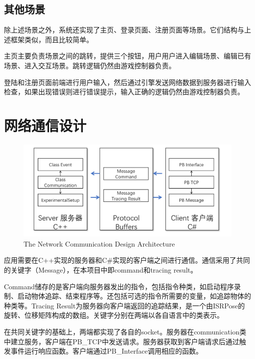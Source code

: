 \subsection{其他场景}
除上述场景之外，系统还实现了主页、登录页面、注册页面等场景。它们结构与上述框架类似，而且比较简单。

主页主要负责场景之间的跳转，提供三个按钮，用户用户进入编辑场景、编辑已有场景、进入交互场景。跳转逻辑仍然由游戏控制器负责。

登陆和注册页面前端进行用户输入，然后通过引擎发送网络数据到服务器进行输入检查，如果出现错误则进行错误提示，输入正确的逻辑仍然由游戏控制器负责。

\section{网络通信设计}
\begin{figure}[!htp]
  \centering
  \includegraphics[width=12cm]{figure/netarc.png}
    {The Network Communication Design Architecture}
 \label{fig:gm}
\end{figure}
应用需要在C++实现的服务器和C\#实现的客户端之间进行通信。通信采用了共同的关键字（Message），在本项目中即command和tracing result。

Command储存的是客户端向服务器发出的指令，包括指令种类，如启动程序录制、启动物体追踪、结束程序等。还包括可选的指令所需要的变量，如追踪物体的种类等。Tracing Result为服务器向客户端返回的追踪结果，是一个由ISRPose的旋转、位移矩阵构成的数组。关键字分别在两端以各自语言中的类表示。

在共同关键字的基础上，两端都实现了各自的socket。服务器在communication类中建立服务，客户端在PB\_TCP中发送请求。服务器获取到客户端请求后通过触发事件运行响应函数。客户端通过PB\_Interface调用相应的函数。
